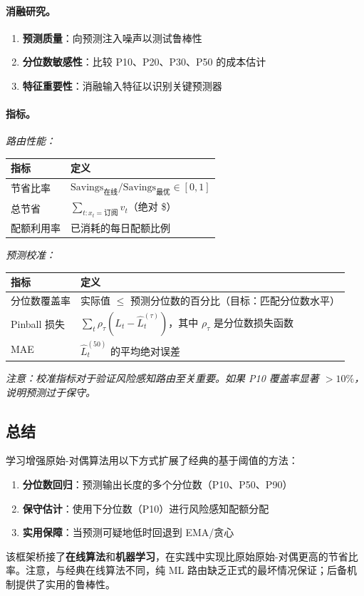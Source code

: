 \documentclass[11pt]{article}
\begin{document}
\paragraph{消融研究。}
\begin{enumerate}
  \item \textbf{预测质量}：向预测注入噪声以测试鲁棒性
  \item \textbf{分位数敏感性}：比较 P10、P20、P30、P50 的成本估计
  \item \textbf{特征重要性}：消融输入特征以识别关键预测器
\end{enumerate}

\paragraph{指标。}

\emph{路由性能：}
\begin{center}
\begin{tabular}{|l|l|}
\hline
\textbf{指标} & \textbf{定义} \\
\hline
节省比率 & $\text{Savings}_{\text{在线}} / \text{Savings}_{\text{最优}} \in [0,1]$ \\
总节省 & $\sum_{t: x_t = \text{订阅}} v_t$（绝对 \$）\\
配额利用率 & 已消耗的每日配额比例 \\
\hline
\end{tabular}
\end{center}

\emph{预测校准：}
\begin{center}
\begin{tabular}{|l|l|}
\hline
\textbf{指标} & \textbf{定义} \\
\hline
分位数覆盖率 & 实际值 $\leq$ 预测分位数的百分比（目标：匹配分位数水平）\\
Pinball 损失 & $\sum_t \rho_\tau (L_t - \hat{L}^{(\tau)}_t)$，其中 $\rho_\tau$ 是分位数损失函数 \\
MAE & $\hat{L}^{(50)}_t$ 的平均绝对误差 \\
\hline
\end{tabular}
\end{center}

\emph{注意：校准指标对于验证风险感知路由至关重要。如果 P10 覆盖率显著 $>10\%$，说明预测过于保守。}

\subsection{总结}

学习增强原始-对偶算法用以下方式扩展了经典的基于阈值的方法：
\begin{enumerate}
  \item \textbf{分位数回归}：预测输出长度的多个分位数（P10、P50、P90）
  \item \textbf{保守估计}：使用下分位数（P10）进行风险感知配额分配
  \item \textbf{实用保障}：当预测可疑地低时回退到 EMA/贪心
\end{enumerate}

该框架桥接了\textbf{在线算法}和\textbf{机器学习}，在实践中实现比原始原始-对偶更高的节省比率。注意，与经典在线算法不同，纯 ML 路由缺乏正式的最坏情况保证；后备机制提供了实用的鲁棒性。
\end{document}
